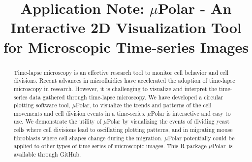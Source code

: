\documentclass[conference]{IEEEtran}
\begin{document}
\title{ Application Note: $\mu$Polar \-- An Interactive 2D Visualization Tool for Microscopic Time-series Images }

 \author{
 \and
{}
 }

\maketitle
\begin{abstract}
Time-lapse microscopy is an effective research tool to monitor cell behavior and cell divisions. Recent advances in microfluidics have accelerated the adoption of time-lapse microscopy in research. However, it is challenging to visualize and interpret the time-series data gathered through time-lapse microscopy. We have developed a circular plotting software tool, $\mu$Polar, to visualize the trends and patterns of the cell movements and cell division events in a time-series. $\mu$Polar is interactive and easy to use. We demonstrate the utility of $\mu$Polar by visualizing the events of dividing yeast cells where cell divisions lead to oscillating plotting patterns, and in migrating mouse fibroblasts where cell shapes change during the migration. $\mu$Polar potentially could be applied to other types of time-series of microscopic images. This R package $\mu$Polar\ is available through GitHub.
\end{abstract}
\end{document}
